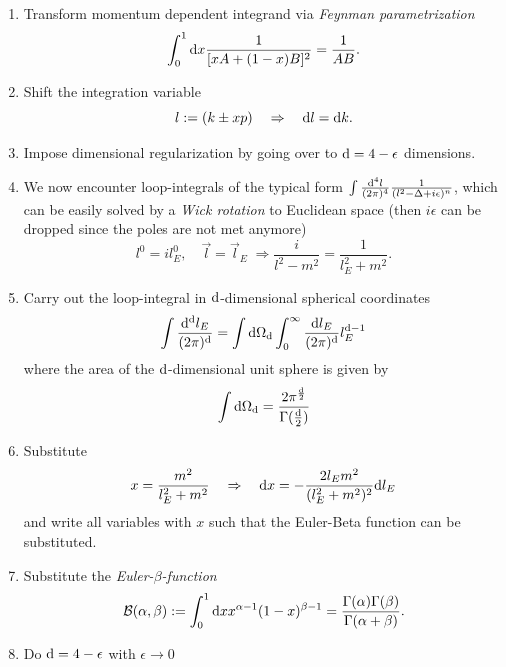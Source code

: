 \begin{enumerate}
	\item Transform momentum dependent integrand via \emph{Feynman parametrization}
	\begin{equation}
		\int_0^1 \mathrm{d} x \frac{1}{[xA+(1-x)B]^2} = \frac{1}{AB}.
	\end{equation}
	\item Shift the integration variable 
	\begin{equation*}
		l:= (k \pm xp) \quad \Rightarrow \quad \mathrm{d} l=\mathrm{d} k.
	\end{equation*}
	\item Impose dimensional regularization by going over to $\mathrm{d}=4-\epsilon$ dimensions.
	\item We now encounter loop-integrals of the typical form $\int \frac{\mathrm{d}^4 l}{(2 \pi)^4} \frac{1}{(l^2-\Delta +i \epsilon)^n}$, which can be easily solved by a \emph{Wick rotation} to Euclidean space (then $i\epsilon$ can be dropped since the poles are not met anymore)
	\begin{equation}
		l^0 = i l^0_E, \quad \vec{l}=\vec{l}_E \;\Rightarrow \frac{i}{l^2-m^2}=\frac{1}{l^2_E+m^2}.
	\end{equation}
	\item  Carry out the loop-integral in $\mathrm{d}$-dimensional spherical coordinates
	\begin{equation}
		\int \frac{\mathrm{d}^{\mathrm{d}}l_E}{(2\pi)^{\mathrm{d}}} = \int \mathrm{d} \Omega_{\mathrm{d}} \int_0^\infty \frac{\mathrm{d} l_E}{(2 \pi)^{\mathrm{d}}} l^{\mathrm{d}-1}_E
	\end{equation}
	where the area of the $\mathrm{d}$-dimensional unit sphere is given by
	\begin{equation}
		\int \mathrm{d} \Omega_{\mathrm{d}} = \frac{2 \pi^{\frac{\mathrm{d}}{2}}}{\Gamma(\frac{\mathrm{d}}{2})}
	\end{equation}
	\item Substitute 
	\begin{equation*}
		x= \frac{m^2}{l^2_E+m^2} \quad \Rightarrow \quad \mathrm{d} x = - \frac{2 l_E m^2}{(l^2_E+m^2)^2} \mathrm{d} l_E
	\end{equation*}
and write all variables with $x$ such that the Euler-Beta function can be substituted.
	\item Substitute the \emph{Euler-$\beta$-function}
	\begin{equation}
		\mathcal{B}(\alpha, \beta) := \int_0^1 \mathrm{d} x x^{\alpha-1} (1-x)^{\beta-1}  = \frac{\Gamma(\alpha) \Gamma(\beta)}{\Gamma(\alpha+\beta)}.
	\end{equation}
	\item Do $\mathrm{d}=4-\epsilon$ with $\epsilon\rightarrow 0$

\end{enumerate}
